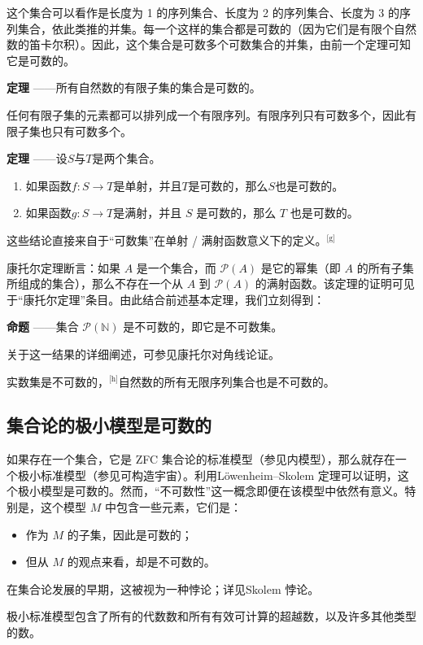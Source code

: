 这个集合可以看作是长度为 1 的序列集合、长度为 2 的序列集合、长度为 3 的序列集合，依此类推的并集。每一个这样的集合都是可数的（因为它们是有限个自然数的笛卡尔积）。因此，这个集合是可数多个可数集合的并集，由前一个定理可知它是可数的。

\textbf{定理} ——所有自然数的有限子集的集合是可数的。

任何有限子集的元素都可以排列成一个有限序列。有限序列只有可数多个，因此有限子集也只有可数多个。

\textbf{定理} ——设$S$与$T$是两个集合。
\begin{enumerate}
\item 如果函数$f : S \to T$是单射，并且$T$是可数的，那么$S$也是可数的。
\item 如果函数$g : S \to T$是满射，并且 $S$ 是可数的，那么 $T$ 也是可数的。
\end{enumerate}

这些结论直接来自于“可数集”在单射 / 满射函数意义下的定义。\(^\text{[g]}\)

康托尔定理断言：如果 $A$ 是一个集合，而 $\mathcal{P}(A)$ 是它的幂集（即 $A$ 的所有子集所组成的集合），那么不存在一个从 $A$ 到 $\mathcal{P}(A)$ 的满射函数。该定理的证明可见于“康托尔定理”条目。由此结合前述基本定理，我们立刻得到：

\textbf{命题} ——集合 $\mathcal{P}(\mathbb{N})$ 是不可数的，即它是不可数集。

关于这一结果的详细阐述，可参见康托尔对角线论证。

实数集是不可数的，\(^\text{[h]}\)自然数的所有无限序列集合也是不可数的。
\subsection{集合论的极小模型是可数的}
如果存在一个集合，它是 ZFC 集合论的标准模型（参见内模型），那么就存在一个极小标准模型（参见可构造宇宙）。利用Löwenheim–Skolem 定理可以证明，这个极小模型是可数的。然而，“不可数性”这一概念即便在该模型中依然有意义。特别是，这个模型 $M$ 中包含一些元素，它们是：
\begin{itemize}
\item 作为 $M$ 的子集，因此是可数的；
\item 但从 $M$ 的观点来看，却是不可数的。
\end{itemize}
在集合论发展的早期，这被视为一种悖论；详见Skolem 悖论。

极小标准模型包含了所有的代数数和所有有效可计算的超越数，以及许多其他类型的数。

